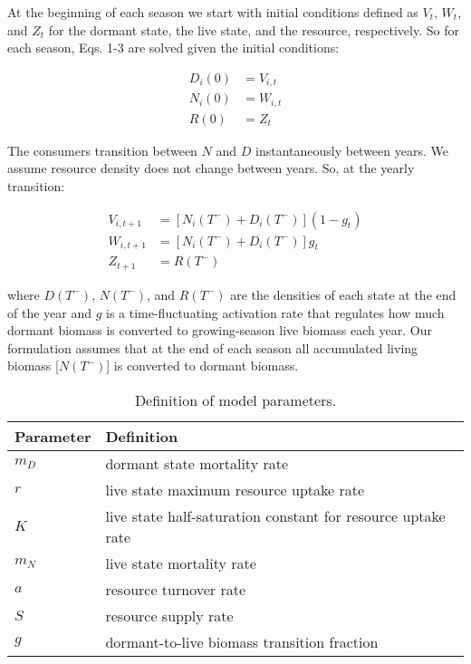 \documentclass[12pt,]{article}
\begin{document}
At the beginning of each season we start with initial conditions defined
as $V_{t}$, $W_{t}$, and $Z_{t}$ for the dormant state, the live state,
and the resource, respectively. So for each season, Eqs. 1-3 are solved
given the initial conditions:

\begin{align}
  D_{i}(0) &= V_{i,t} \\
  N_{i}(0) &= W_{i,t} \\
  R(0) &= Z_{t}
\end{align}

The consumers transition between $N$ and $D$ instantaneously between
years. We assume resource density does not change between years. So, at
the yearly transition:

\begin{align}
  V_{i,t+1} &= [N_{i}(T^-)+D_{i}(T^-)](1-g_{t}) \\
  W_{i,t+1} &= [N_{i}(T^-)+D_{i}(T^-)]g_{t} \\
  Z_{t+1} &= R(T^-)
\end{align}

where $D(T^-)$, $N(T^-)$, and $R(T^-)$ are the densities of each state
at the end of the year and $g$ is a time-fluctuating activation rate
that regulates how much dormant biomass is converted to growing-season
live biomass each year. Our formulation assumes that at the end of each
season all accumulated living biomass {[}$N(T^-)${]} is converted to
dormant biomass.

\begin{center}
\begin{table}
\caption{Definition of model parameters.}
\begin{tabular}{l l}
\hline
Parameter & Definition \\
\hline
$m_{D}$ & dormant state mortality rate \\
$r$ & live state maximum resource uptake rate \\
$K$ & live state half-saturation constant for resource uptake rate \\
$m_{N}$ & live state mortality rate \\
$a$ & resource turnover rate \\
$S$ & resource supply rate \\
$g$ & dormant-to-live biomass transition fraction \\ 
\hline
\end{tabular}
\end{table}
\end{center}
\end{document}
